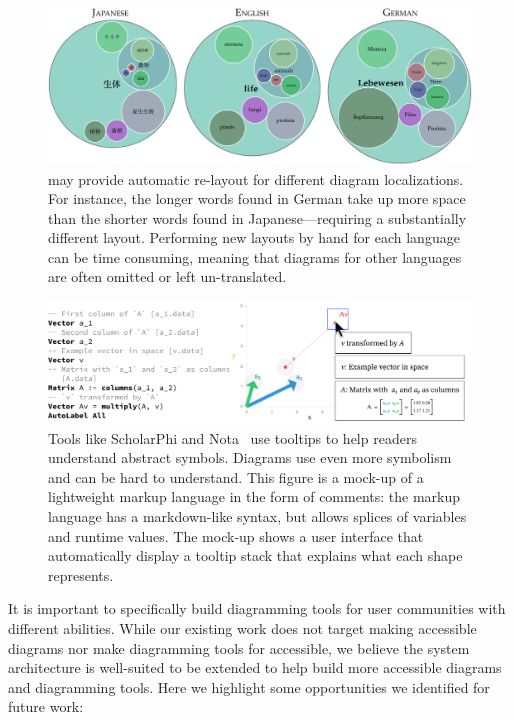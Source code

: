 \begin{figure}
\centering
\includegraphics[width=.8\textwidth]{assets/penrose/SloanLanguageLocalization.pdf}
\caption{\Penrose{} may provide automatic re-layout for different diagram localizations.  For instance, the longer words found in German take up more space than the shorter words found in Japanese---requiring a substantially different layout. Performing new layouts by hand for each language can be time consuming, meaning that diagrams for other languages are often omitted or left un-translated.\label{fig:SloanLanguageLocalization}}
\end{figure}

\begin{figure}
    \centering
    \includegraphics[width=\linewidth]{assets/chapter-4/docs-tooltips.pdf}
    \caption{Tools like ScholarPhi and Nota~\cite{scholarPhi, nota} use tooltips to help readers understand abstract symbols. Diagrams use even more symbolism and can be hard to understand. This figure is a mock-up of a lightweight markup language in the form of \Substance comments: the markup language has a markdown-like syntax, but allows splices of \Substance variables and runtime values. The mock-up shows a user interface that automatically display a tooltip stack that explains what each shape represents.\label{fig:tooltips}}
\end{figure}

It is important to specifically build diagramming tools for user communities with different abilities. While our existing work does not target making accessible diagrams nor make diagramming tools for accessible, we believe the \Penrose{} system architecture is well-suited to be extended to help build more accessible diagrams and diagramming tools. Here we highlight some opportunities we identified for future work:

